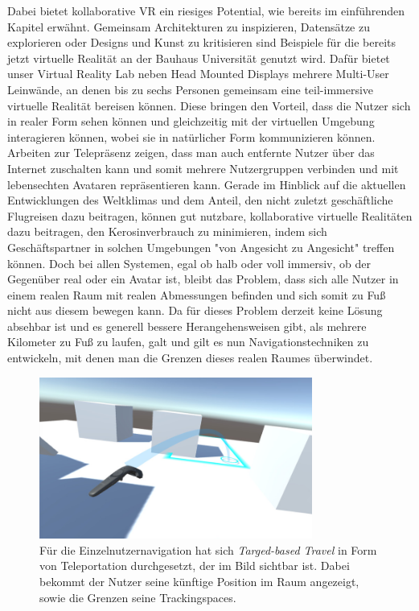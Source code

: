 Dabei bietet kollaborative VR ein riesiges Potential, wie bereits im einführenden Kapitel erwähnt. Gemeinsam Architekturen zu inspizieren, Datensätze zu explorieren oder Designs und Kunst zu kritisieren sind Beispiele für die bereits jetzt virtuelle Realität an der Bauhaus Universität genutzt wird. Dafür bietet unser Virtual Reality Lab neben Head Mounted Displays mehrere Multi-User Leinwände, an denen bis zu sechs Personen gemeinsam eine teil-immersive virtuelle Realität bereisen können\cite{Kulik2011C1x6}. Diese bringen den Vorteil, dass die Nutzer sich in realer Form sehen können und gleichzeitig mit der virtuellen Umgebung interagieren können, wobei sie in natürlicher Form kommunizieren können.
Arbeiten zur Telepräsenz\cite{BeckImmersiveTelepresence} zeigen, dass man auch entfernte Nutzer über das Internet zuschalten kann und somit mehrere Nutzergruppen verbinden und mit lebensechten Avataren repräsentieren kann. 
Gerade im Hinblick auf die aktuellen Entwicklungen des Weltklimas und dem Anteil, den nicht zuletzt geschäftliche Flugreisen dazu beitragen, können gut nutzbare, kollaborative virtuelle Realitäten dazu beitragen, den Kerosinverbrauch zu minimieren, indem sich Geschäftspartner in solchen Umgebungen "von Angesicht zu Angesicht" treffen können.
Doch bei allen Systemen, egal ob halb oder voll immersiv, ob der Gegenüber real oder ein Avatar ist, bleibt das Problem, dass sich alle Nutzer in einem realen Raum mit realen Abmessungen befinden und sich somit zu Fuß nicht aus diesem bewegen kann. Da für dieses Problem derzeit keine Lösung absehbar ist und es generell bessere Herangehensweisen gibt, als mehrere Kilometer zu Fuß zu laufen, galt und gilt es nun Navigationstechniken zu entwickeln, mit denen man die Grenzen dieses realen Raumes überwindet.

\begin{figure}[H]
	\centering
		\includegraphics[width=0.8\textwidth]{images/steam_teleport.jpg}
	\caption{Für die Einzelnutzernavigation hat sich \textit{Targed-based Travel} in Form von Teleportation durchgesetzt, der im Bild sichtbar ist. Dabei bekommt der Nutzer seine künftige Position im Raum angezeigt, sowie die Grenzen seine Trackingspaces.}
\end{figure}


